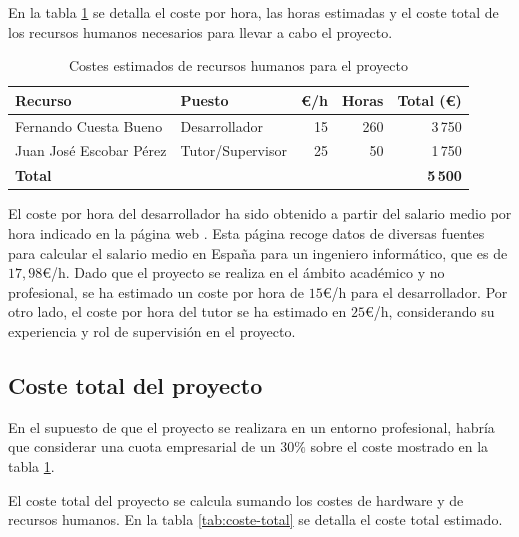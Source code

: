 En la tabla \ref{tab:recursos-humanos} se detalla el coste por hora, las horas estimadas y el coste total de los recursos humanos necesarios para llevar a cabo el proyecto.

\begin{table}[!ht]
      \centering
      \begin{tabular}{|l|l|r|r|r|}
            \hline
            \textbf{Recurso}        & \textbf{Puesto}  & \textbf{€/h} & \textbf{Horas} & \textbf{Total (€)} \\
            \hline
            Fernando Cuesta Bueno   & Desarrollador    & 15           & 260            & 3\,750             \\
            Juan José Escobar Pérez & Tutor/Supervisor & 25           & 50             & 1\,750             \\
            \hline
            \textbf{Total}          &                  &              &                & \textbf{5\,500}    \\
            \hline
      \end{tabular}
      \caption{Costes estimados de recursos humanos para el proyecto}
      \label{tab:recursos-humanos}
\end{table}

El coste por hora del desarrollador ha sido obtenido a partir del salario medio por hora indicado en la página web \cite{joobleIngenieroInformatico}. Esta página recoge datos de diversas fuentes para calcular el salario medio en España para un ingeniero informático, que es de $17,98$€/h. Dado que el proyecto se realiza en el ámbito académico y no profesional, se ha estimado un coste por hora de $15$€/h para el desarrollador. Por otro lado, el coste por hora del tutor se ha estimado en $25$€/h, considerando su experiencia y rol de supervisión en el proyecto.


\subsection{Coste total del proyecto}

En el supuesto de que el proyecto se realizara en un entorno profesional, habría que considerar una cuota empresarial de un $30\%$ sobre el coste mostrado en la tabla \ref{tab:recursos-humanos}.

El coste total del proyecto se calcula sumando los costes de hardware y de recursos humanos. En la tabla \ref{tab:coste-total} se detalla el coste total estimado.

